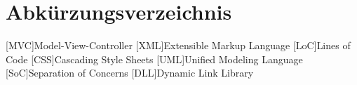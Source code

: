 \chapter*{Abkürzungsverzeichnis}
\label{abkürzungsverzeichnis}

\begin{acronym}
	[MVC]{Model-View-Controller}
	[XML]{Extensible Markup Language}
	[LoC]{Lines of Code}
	[CSS]{Cascading Style Sheets}
	[UML]{Unified Modeling Language}
	[SoC]{Separation of Concerns}
	[DLL]{Dynamic Link Library}
\end{acronym}

